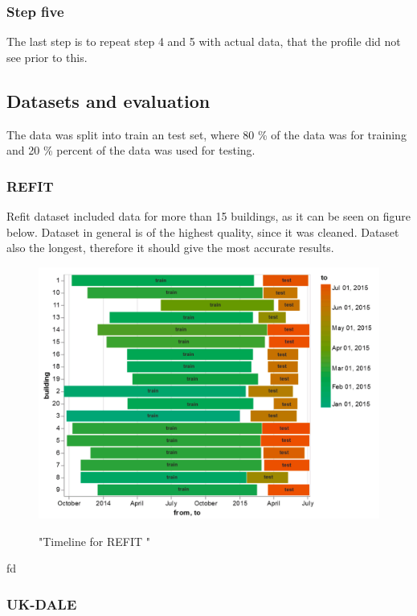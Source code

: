 \subsubsection{Step five}

The last step is to repeat step 4 and 5 with actual data, that the profile did not see prior to this. 

\subsection{Datasets and evaluation} \label{ssec:ds_eval}

The data was split into train an test set, where 80 \% of the data was for training and 20 \% percent of the data was used for testing.


\subsubsection{REFIT}
Refit dataset included data for more than 15 buildings, as it can be seen on figure below.
Dataset in general is of the highest quality, since it was cleaned. 
Dataset also the longest, therefore it should give the most accurate results.

\begin{figure}[H]
	\centering
	\caption{"Timeline for REFIT "}
	\includegraphics[width=1\textwidth]{Figures/EC/refit_timeline.png}
	\label{fig:refit_timeline}
\end{figure}
fd
\subsubsection{UK-DALE} 

